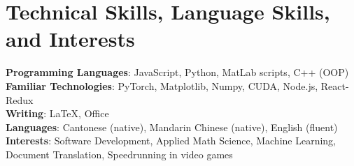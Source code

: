 \documentclass[letterpaper,12pt]{article}
\begin{document}
\section{Technical Skills, Language Skills, and Interests}
 \begin{itemize}[leftmargin=0.15in, label={}]
    \small{\item{
     \textbf{Programming Languages}{: JavaScript, Python, MatLab scripts, C++ (OOP)} \\
     \textbf{Familiar Technologies}{: PyTorch, Matplotlib, Numpy, CUDA, Node.js, React-Redux} \\
     \textbf{Writing}{: \LaTeX, Office} \\
     \textbf{Languages}{: Cantonese (native), Mandarin Chinese (native), English (fluent)} \\
     \textbf{Interests}{: Software Development, Applied Math Science, Machine Learning, Document Translation, Speedrunning in video games} \\ 
    }}
 \end{itemize}


\newpage
\end{document}
